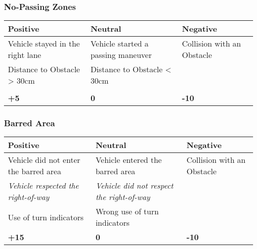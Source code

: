 {

\subsubsection*{No-Passing Zones}
\begin{table}[H]
    \begin{tabularx}{\textwidth}{XXX}
        \toprule
        \textbf{Positive}                & \textbf{Neutral}                   & \textbf{Negative}          \\
        \midrule
        Vehicle stayed in the right lane & Vehicle started a passing maneuver & Collision with an Obstacle \\
        Distance to Obstacle > 30cm      & Distance to Obstacle < 30cm        &                            \\
                                         &                                    &                            \\
        \topstrut
        \textbf{+5}                      & \textbf{0}                         & \textbf{-10}               \\
        \bottomrule
    \end{tabularx}
\end{table}

\subsubsection*{Barred Area}
\begin{table}[H]
    \begin{tabularx}{\textwidth}{XXX}
        \toprule
        \textbf{Positive}                                           & \textbf{Neutral}                                                  & \textbf{Negative}          \\
        \midrule
        Vehicle did not enter the barred area                       & Vehicle entered the barred area                                   & Collision with an Obstacle \\
        \textit{Vehicle respected the right-of-way}\footnotemark[1] & \textit{Vehicle did not respect the right-of-way}\footnotemark[1] &                            \\
        Use of turn indicators                                      & Wrong use of turn indicators                                      &                            \\
        \topstrut
        \textbf{+15}                                                & \textbf{0}                                                        & \textbf{-10}               \\
        \bottomrule
    \end{tabularx}
\end{table}

}
